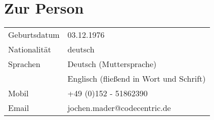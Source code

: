 \section*{Zur Person}
\begin{longtable}{@{}p{6cm}p{10cm}}
Geburtsdatum 	& 03.12.1976\\
Nationalität 	& deutsch\\
Sprachen 		& Deutsch (Muttersprache)\\
				& Englisch (fließend in Wort und Schrift)\\
Mobil			& +49 (0)152 - 51862390\\
Email			& jochen.mader@codecentric.de
\end{longtable}

